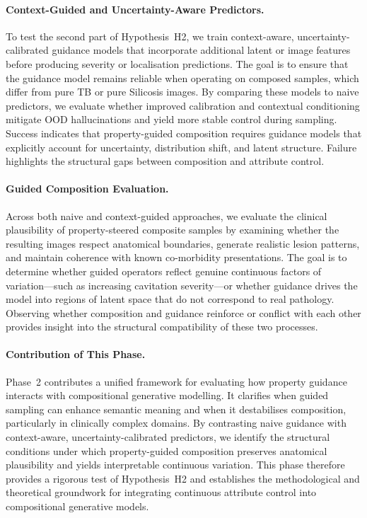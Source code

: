 \paragraph{Context-Guided and Uncertainty-Aware Predictors.}
To test the second part of Hypothesis~H2, we train context-aware, uncertainty-
calibrated guidance models that incorporate additional latent or image features
before producing severity or localisation predictions. The goal is to ensure
that the guidance model remains reliable when operating on composed samples,
which differ from pure TB or pure Silicosis images. By comparing these models
to naive predictors, we evaluate whether improved calibration and contextual
conditioning mitigate OOD hallucinations and yield more stable control during
sampling. Success indicates that property-guided composition requires guidance
models that explicitly account for uncertainty, distribution shift, and latent
structure. Failure highlights the structural gaps between composition and
attribute control.

\paragraph{Guided Composition Evaluation.}
Across both naive and context-guided approaches, we evaluate the clinical
plausibility of property-steered composite samples by examining whether the
resulting images respect anatomical boundaries, generate realistic lesion
patterns, and maintain coherence with known co-morbidity presentations. The
goal is to determine whether guided operators reflect genuine continuous factors
of variation—such as increasing cavitation severity—or whether guidance drives
the model into regions of latent space that do not correspond to real
pathology. Observing whether composition and guidance reinforce or conflict with
each other provides insight into the structural compatibility of these two
processes.

\paragraph{Contribution of This Phase.}
Phase~2 contributes a unified framework for evaluating how property guidance
interacts with compositional generative modelling. It clarifies when guided
sampling can enhance semantic meaning and when it destabilises composition,
particularly in clinically complex domains. By contrasting naive guidance with
context-aware, uncertainty-calibrated predictors, we identify the structural
conditions under which property-guided composition preserves anatomical
plausibility and yields interpretable continuous variation. This phase therefore
provides a rigorous test of Hypothesis~H2 and establishes the methodological and
theoretical groundwork for integrating continuous attribute control into
compositional generative models.
